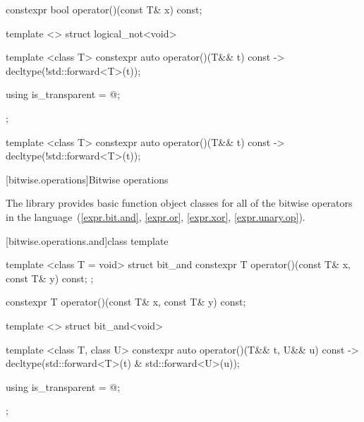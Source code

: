 %
\begin{itemdecl}
constexpr bool operator()(const T& x) const;
\end{itemdecl}

\begin{itemdescr}
\pnum\returns {}
\end{itemdescr}

%
\begin{itemdecl}
template <> struct logical_not<void> {
  template <class T> constexpr auto operator()(T&& t) const
    -> decltype(!std::forward<T>(t));

  using is_transparent = @\unspec@;
};
\end{itemdecl}

%
\begin{itemdecl}
template <class T> constexpr auto operator()(T&& t) const
    -> decltype(!std::forward<T>(t));
\end{itemdecl}

\begin{itemdescr}
\pnum\returns {}
\end{itemdescr}


[bitwise.operations]{Bitwise operations}

\pnum
The library provides basic function object classes for all of the bitwise
operators in the language~(\ref{expr.bit.and}, \ref{expr.or},
\ref{expr.xor}, \ref{expr.unary.op}).

[bitwise.operations.and]{class template }

%
\begin{itemdecl}
template <class T = void> struct bit_and {
  constexpr T operator()(const T& x, const T& y) const;
};
\end{itemdecl}

%
\begin{itemdecl}
constexpr T operator()(const T& x, const T& y) const;
\end{itemdecl}

\begin{itemdescr}
\pnum\returns {}
\end{itemdescr}

%
\begin{itemdecl}
template <> struct bit_and<void> {
  template <class T, class U> constexpr auto operator()(T&& t, U&& u) const
    -> decltype(std::forward<T>(t) & std::forward<U>(u));

  using is_transparent = @\unspec@;
};
\end{itemdecl}

